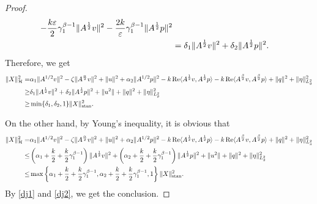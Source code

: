 \documentclass[12pt,reqno]{article}
\begin{document}
\begin{proof}
\begin{align}
			- \frac{k\varepsilon}{2}\gamma_1^{\beta-1}\|A^{\frac{1}{2}}v\|^2
			- \frac{2k}{\varepsilon}\gamma_1^{\beta-1}\|A^{\frac{1}{2}}p\|^2  \notag\\
			& = \delta_1\|A^{\frac{1}{2}}v\|^2+ \delta_2\|A^{\frac{1}{2}}p\|^2.
		\end{align}
		Therefore, we get
		\begin{align}\label{dj1}
			\|X\|_{\mathcal{H}}^2=&\alpha_1 \|A^{1/2}v\|^2 - \zeta\|A^{\frac{\alpha}{2}}v\|^2 + \|u\|^2+ \alpha_2 \|A^{1/2}p\|^2 - k \operatorname{Re} \langle A^{\frac{1}{2}} v, A^{\frac{1}{2}} p \rangle
			- k \operatorname{Re} \langle A^{\frac{\beta}{2}} v, A^{\frac{\beta}{2}} p \rangle+ \|q\|^2 + \|\eta\|_{L_g^2}^2\notag\\
			\ge&\delta_1\|A^{\frac{1}{2}}v\|^2+ \delta_2\|A^{\frac{1}{2}}p\|^2+\|u^2\|+\|q\|^2 + \|\eta\|_{L_g^2}^2\notag\\
			\ge&\min\{\delta_1,\delta_2,1\}\|X\|_{\rm stan}^2.
		\end{align}
		
		On the other hand, by Young's inequality, it is obvious that
		\begin{align}\label{dj2}
			\|X\|_{\mathcal{H}}^2=&\alpha_1 \|A^{1/2}v\|^2 - \zeta\|A^{\frac{\alpha}{2}}v\|^2 + \|u\|^2+ \alpha_2 \|A^{1/2}p\|^2 - k \operatorname{Re} \langle A^{\frac{1}{2}} v, A^{\frac{1}{2}} p \rangle
			- k \operatorname{Re} \langle A^{\frac{\beta}{2}} v, A^{\frac{\beta}{2}} p \rangle+ \|q\|^2 + \|\eta\|_{L_g^2}^2\notag\\
			\le&\left(\alpha_1+\frac k2+\frac k2\gamma_1^{\beta-1}\right)\|A^{\frac{1}{2}}v\|^2+ \left(\alpha_2+\frac k2+\frac k2\gamma_1^{\beta-1}\right)\|A^{\frac{1}{2}}p\|^2+\|u^2\|+\|q\|^2 + \|\eta\|_{L_g^2}^2\notag\\
			\le&\max\left\{\alpha_1+\frac k2+\frac k2\gamma_1^{\beta-1},\alpha_2+\frac k2+\frac k2\gamma_1^{\beta-1},1\right\}\|X\|_{\rm stan}^2.
		\end{align}
		By \eqref{dj1} and \eqref{dj2}, we get the conclusion.
	\end{proof}
	
\end{document}
